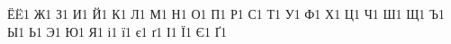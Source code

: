 {    {Ё}{{\"E}}1
    {Ж}{{\selectfont{}}}1
    {З}{{\selectfont{}}}1
    {И}{{\selectfont{}}}1
    {Й}{{\selectfont{}}}1
    {К}{{\selectfont{}}}1
    {Л}{{\selectfont{}}}1
    {М}{{\selectfont{}}}1
    {Н}{{\selectfont{}}}1
    {О}{{\selectfont{}}}1
    {П}{{\selectfont{}}}1
    {Р}{{\selectfont{}}}1
    {С}{{\selectfont{}}}1
    {Т}{{\selectfont{}}}1
    {У}{{\selectfont{}}}1
    {Ф}{{\selectfont{}}}1
    {Х}{{\selectfont{}}}1
    {Ц}{{\selectfont{}}}1
    {Ч}{{\selectfont{}}}1
    {Ш}{{\selectfont{}}}1
    {Щ}{{\selectfont{}}}1
    {Ъ}{{\selectfont{}}}1
    {Ы}{{\selectfont{}}}1
    {Ь}{{\selectfont{}}}1
    {Э}{{\selectfont{}}}1
    {Ю}{{\selectfont{}}}1
    {Я}{{\selectfont{}}}1
    {і}{{\selectfont{}}}1
    {ї}{{\selectfont{}}}1
    {є}{{\selectfont{}}}1
    {ґ}{{\selectfont{}}}1
    {І}{{\selectfont{}}}1
    {Ї}{{\selectfont{}}}1
    {Є}{{\selectfont{}}}1
    {Ґ}{{\selectfont{}}}1
}
